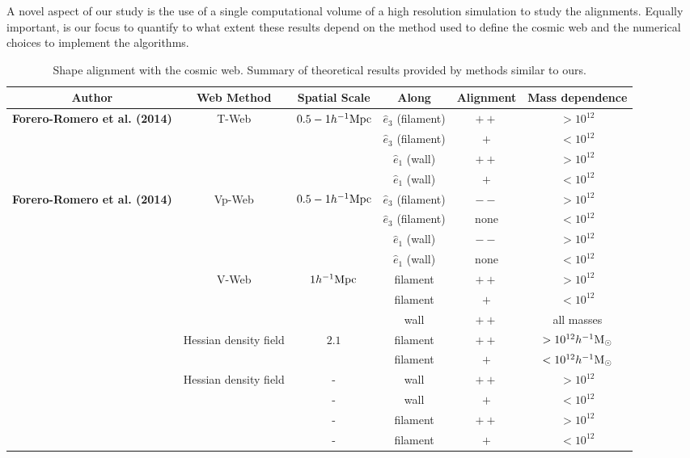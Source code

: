 \documentclass[useAMS,usenatbib]{mn2e}
\newcommand{\hMpc}{{\ifmmode{h^{-1}{\rm Mpc}}\else{$h^{-1}$Mpc }\fi}}
\newcommand{\hMsun}{{\ifmmode{h^{-1}{\rm
        {M_{\odot}}}}\else{$h^{-1}{\rm{M_{\odot}}}$~}\fi}}
\begin{document}
A novel aspect of our study is the use of a single computational
volume of a high resolution simulation to study the
alignments. Equally important, is our focus to quantify to what extent
these results depend on the method used to define the cosmic web and
the numerical choices to implement the algorithms.  

\begin{table}
\begin{tabular}{cccccc}\hline\hline
Author & Web Method & Spatial Scale & Along &
Alignment & Mass dependence\\\hline

{\bf Forero-Romero et al. (2014)} & T-Web & $0.5-1 \hMpc$ &
$\hat{e}_3$ (filament) &$++$ & $>10^{12}$\hMsun\\
&   & &
$\hat{e}_3$ (filament) & $+$ & $<10^{12}$\hMsun\\

&   & &
$\hat{e}_1$ (wall) & $++$ & $>10^{12}$\hMsun\\

&   & &
$\hat{e}_1$ (wall) & $+$ & $<10^{12}$\hMsun\\\hline

{\bf Forero-Romero et al. (2014)} & Vp-Web & $0.5-1 \hMpc$ &
$\hat{e}_3$ (filament) &$--$ & $>10^{12}$\hMsun\\
&   & &
$\hat{e}_3$ (filament) & none & $<10^{12}$\hMsun\\
&   & &
$\hat{e}_1$ (wall) & $--$ & $>10^{12}$\hMsun\\

&   & &
$\hat{e}_1$ (wall) & none & $<10^{12}$\hMsun\\\hline


\cite{Libeskind2013} & V-Web & $1 \hMpc$ &
filament &$++$ & $>10^{12}$\hMsun\\
&   & &
filament &$+$ & $<10^{12}$\hMsun\\
&   & &
wall & $++$ & all masses\\\hline

\cite{Zhang2009}  & Hessian density field &  $2.1$\hMpc &
filament & $++$ & $>10^{12}\hMsun$\\

& &  &
filament & $+$ & $<10^{12}\hMsun$\\\hline

\cite{AragonCalvo2007} & Hessian density field & - &
wall & $++$ & $>10^{12}$\hMsun\\

& & - &
wall & $+$ & $<10^{12}$\hMsun\\

& & - &
filament& $++$ & $>10^{12}$\hMsun\\

& & - &
filament& $+$ & $<10^{12}$\hMsun\\\hline \hline

\end{tabular}\\
\caption{Shape alignment with the cosmic web. Summary of theoretical
  results provided by methods similar to ours.}
\end{table}
\end{document}

